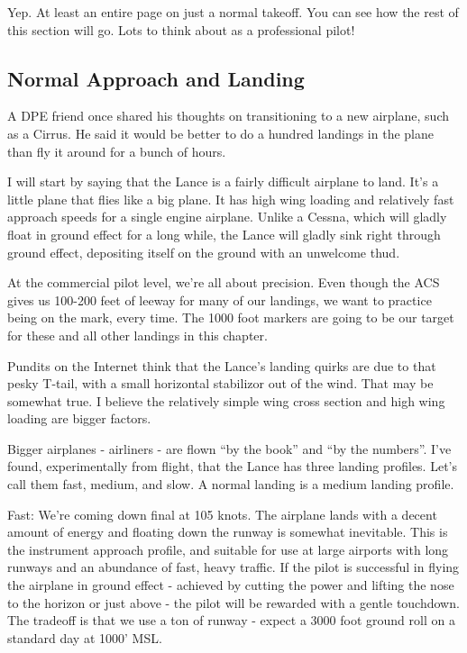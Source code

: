 Yep. At least an entire page on just a normal takeoff. You can see how the rest of this section will go. Lots to think about as a professional pilot!

\subsection{Normal Approach and Landing}

A DPE friend once shared his thoughts on transitioning to a new airplane, such as a Cirrus. He said it would be better to do a hundred landings in the plane than fly it around for a bunch of hours.

I will start by saying that the Lance is a fairly difficult airplane to land. It's a little plane that flies like a big plane. It has high wing loading and relatively fast approach speeds for a single engine airplane. Unlike a Cessna, which will gladly float in ground effect for a long while, the Lance will gladly sink right through ground effect, depositing itself on the ground with an unwelcome thud.

At the commercial pilot level, we're all about precision. Even though the ACS gives us 100-200 feet of leeway for many of our landings, we want to practice being on the mark, every time. The 1000 foot markers are going to be our target for these and all other landings in this chapter.

Pundits on the Internet think that the Lance's landing quirks are due to that pesky T-tail, with a small horizontal stabilizor out of the wind. That may be somewhat true. I believe the relatively simple wing cross section and high wing loading are bigger factors.

Bigger airplanes - airliners - are flown ``by the book'' and ``by the numbers''. I've found, experimentally from flight, that the Lance has three landing profiles. Let's call them fast, medium, and slow. A normal landing is a medium landing profile.

Fast: We're coming down final at 105 knots. The airplane lands with a decent amount of energy and floating down the runway is somewhat inevitable. This is the instrument approach profile, and suitable for use at large airports with long runways and an abundance of fast, heavy traffic. If the pilot is successful in flying the airplane in ground effect - achieved by cutting the power and lifting the nose to the horizon or just above - the pilot will be rewarded with a gentle touchdown. The tradeoff is that we use a ton of runway - expect a 3000 foot ground roll on a standard day at 1000' MSL.

